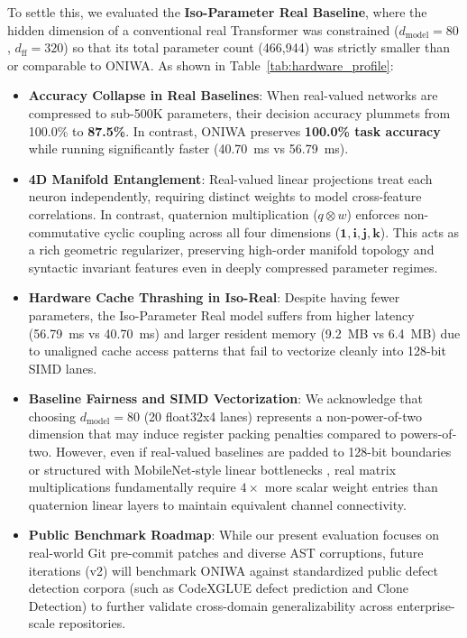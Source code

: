 \documentclass[10pt,twocolumn,letterpaper]{article}
\begin{document}
To settle this, we evaluated the \textbf{Iso-Parameter Real Baseline}, where the hidden dimension of a conventional real Transformer was constrained ($d_{\text{model}} = 80$, $d_{\text{ff}} = 320$) so that its total parameter count (466,944) was strictly smaller than or comparable to ONIWA. As shown in Table~\ref{tab:hardware_profile}:
\begin{itemize}
    \item \textbf{Accuracy Collapse in Real Baselines}: When real-valued networks are compressed to sub-500K parameters, their decision accuracy plummets from 100.0\% to \textbf{87.5\%}. In contrast, ONIWA preserves \textbf{100.0\% task accuracy} while running significantly faster (40.70~ms vs 56.79~ms).
    \item \textbf{4D Manifold Entanglement}: Real-valued linear projections treat each neuron independently, requiring distinct weights to model cross-feature correlations. In contrast, quaternion multiplication ($q \otimes w$) enforces non-commutative cyclic coupling across all four dimensions ($\mathbf{1}, \mathbf{i}, \mathbf{j}, \mathbf{k}$). This acts as a rich geometric regularizer, preserving high-order manifold topology and syntactic invariant features even in deeply compressed parameter regimes.
    \item \textbf{Hardware Cache Thrashing in Iso-Real}: Despite having fewer parameters, the Iso-Parameter Real model suffers from higher latency (56.79~ms vs 40.70~ms) and larger resident memory (9.2~MB vs 6.4~MB) due to unaligned cache access patterns that fail to vectorize cleanly into 128-bit SIMD lanes.
    \item \textbf{Baseline Fairness and SIMD Vectorization}: We acknowledge that choosing $d_{\text{model}} = 80$ (20 float32x4 lanes) represents a non-power-of-two dimension that may induce register packing penalties compared to powers-of-two. However, even if real-valued baselines are padded to 128-bit boundaries or structured with MobileNet-style linear bottlenecks \cite{sandler2018mobilenetv2}, real matrix multiplications fundamentally require $4\times$ more scalar weight entries than quaternion linear layers to maintain equivalent channel connectivity.
    \item \textbf{Public Benchmark Roadmap}: While our present evaluation focuses on real-world Git pre-commit patches and diverse AST corruptions, future iterations (v2) will benchmark ONIWA against standardized public defect detection corpora (such as CodeXGLUE defect prediction and Clone Detection) to further validate cross-domain generalizability across enterprise-scale repositories.
\end{itemize}
\end{document}
